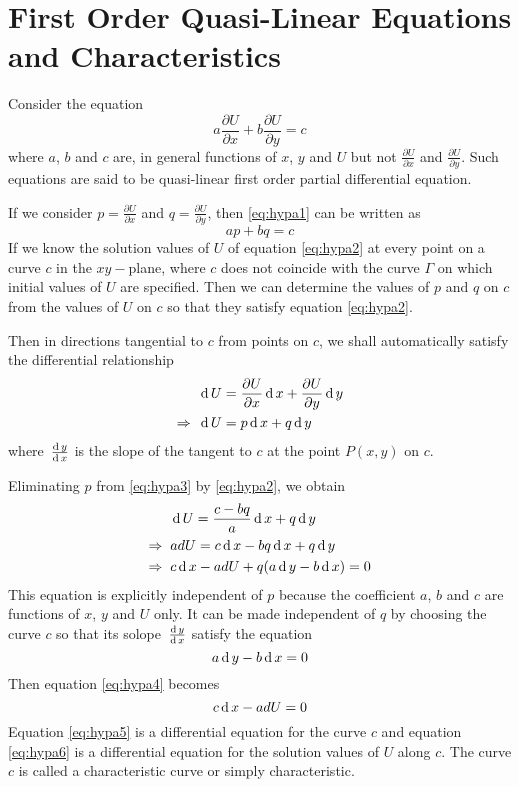 \documentclass[../main-sheet.tex]{subfiles}
\begin{document}
\section{First Order Quasi-Linear Equations and Characteristics}
Consider the equation
\begin{equation}
    a\frac{\partial U}{\partial x}+b\frac{\partial U}{\partial y}=c\label{eq:hypa1}
\end{equation}
where \(a\), \(b\) and \(c\) are, in general functions of \(x\), \(y\) and \(U\) but not \(\frac{\partial U}{\partial x}\) and \(\frac{\partial U}{\partial y}\). Such equations are said to be quasi-linear first order partial differential equation.

If we consider \(p=\frac{\partial U}{\partial x}\) and \(q=\frac{\partial U}{ \partial y}\), then \eqref{eq:hypa1} can be written as
\begin{equation}
    ap+bq=c\label{eq:hypa2}
\end{equation}
If we know the solution values of \(U\) of equation \eqref{eq:hypa2} at every point on a curve \(c\) in the \(xy-\)plane, where \(c\) does not coincide with the curve \(\Gamma\) on which initial values of \(U\) are specified. Then we can determine the values of \(p\) and \(q\) on \(c\) from the values of \(U\) on \(c\) so that they satisfy equation \eqref{eq:hypa2}.

Then in directions tangential to \(c\) from points on \(c\), we shall automatically satisfy the differential relationship
\begin{align}
    &\,\mathrm{d}\, U=\frac{\partial U}{\partial x}\,\mathrm{d}\, x+\frac{\partial U}{\partial y}\,\mathrm{d}\, y\notag\\
    \Rightarrow\;\;&\,\mathrm{d}\, U=p\,\mathrm{d}\, x+q\,\mathrm{d}\, y\label{eq:hypa3}
\end{align}
where \(\,\frac{\mathrm{d}\,y}{\mathrm{d}\,x}\)  is the slope of the tangent to \(c\) at the point \(P(x,y)\) on \(c\).

Eliminating \(p\) from \eqref{eq:hypa3} by \eqref{eq:hypa2}, we obtain
\begin{align}
    &\,\mathrm{d}\, U=\frac{c-bq}{a}\,\mathrm{d}\, x+q\,\mathrm{d}\, y\notag\\
    \Rightarrow\;\;&ad U=c\,\mathrm{d}\, x-bq\,\mathrm{d}\, x+q\,\mathrm{d}\, y\notag\\
    \Rightarrow\;\;&c\,\mathrm{d}\, x-ad U+q(a\,\mathrm{d}\, y-b\,\mathrm{d}\, x)=0\label{eq:hypa4}
\end{align}
This equation is explicitly independent of  \(p\) because the coefficient \(a\), \(b\) and \(c\) are functions of \(x \), \(y\) and \(U\) only. It can be made independent of \(q\) by choosing the curve \(c\) so that its solope \(\,\frac{\mathrm{d}\,y}{\mathrm{d}\,x} \) satisfy the equation
\begin{equation}
    a\,\mathrm{d}\, y-b\,\mathrm{d}\, x=0\label{eq:hypa5}
\end{equation}
Then equation \eqref{eq:hypa4} becomes
\begin{equation}
    c\,\mathrm{d}\, x-adU=0\label{eq:hypa6}
\end{equation}
Equation \eqref{eq:hypa5} is a differential equation for the curve \(c\) and equation \eqref{eq:hypa6} is a differential equation for the solution values of \(U\) along \(c\). The curve \(c\) is called a characteristic curve or simply characteristic.
\end{document}
